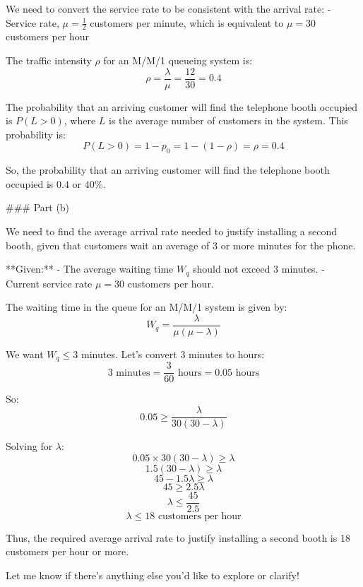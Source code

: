 We need to convert the service rate to be consistent with the arrival rate:
- Service rate, \( \mu = \frac{1}{2} \) customers per minute, which is equivalent to \( \mu = 30 \) customers per hour

The traffic intensity \( \rho \) for an M/M/1 queueing system is:
\[ \rho = \frac{\lambda}{\mu} = \frac{12}{30} = 0.4 \]

The probability that an arriving customer will find the telephone booth occupied is \( P(L > 0) \), where \( L \) is the average number of customers in the system. This probability is:
\[ P(L > 0) = 1 - p_0 = 1 - (1 - \rho) = \rho = 0.4 \]

So, the probability that an arriving customer will find the telephone booth occupied is \( 0.4 \) or \( 40\% \).

### Part (b)

We need to find the average arrival rate needed to justify installing a second booth, given that customers wait an average of 3 or more minutes for the phone.

**Given:**
- The average waiting time \( W_q \) should not exceed 3 minutes.
- Current service rate \( \mu = 30 \) customers per hour.

The waiting time in the queue for an M/M/1 system is given by:
\[ W_q = \frac{\lambda}{\mu(\mu - \lambda)} \]

We want \( W_q \leq 3 \) minutes. Let's convert 3 minutes to hours:
\[ 3 \text{ minutes} = \frac{3}{60} \text{ hours} = 0.05 \text{ hours} \]

So:
\[ 0.05 \geq \frac{\lambda}{30(30 - \lambda)} \]

Solving for \( \lambda \):
\[ 0.05 \times 30(30 - \lambda) \geq \lambda \]
\[ 1.5(30 - \lambda) \geq \lambda \]
\[ 45 - 1.5\lambda \geq \lambda \]
\[ 45 \geq 2.5\lambda \]
\[ \lambda \leq \frac{45}{2.5} \]
\[ \lambda \leq 18 \text{ customers per hour} \]

Thus, the required average arrival rate to justify installing a second booth is 18 customers per hour or more.

Let me know if there's anything else you'd like to explore or clarify!